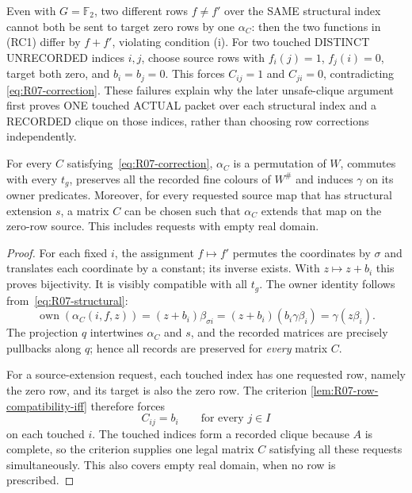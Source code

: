 \begin{remark}
\label{rem:R07-row-conflict-controls}
Even with $G=\mathbb F_2$,
two different rows $f\ne f'$
over the SAME structural index
cannot both be sent to target
zero rows by one $\alpha_C$:
then the two functions in (RC1)
differ by $f+f'$, violating
condition (i). For two touched
DISTINCT UNRECORDED indices
$i,j$, choose source rows
with $f_i(j)=1$, $f_j(i)=0$,
target both zero, and $b_i=b_j=0$.
This forces $C_{ij}=1$ and
$C_{ji}=0$, contradicting
\eqref{eq:R07-correction}.
These failures explain why
the later unsafe-clique
argument first proves ONE
touched ACTUAL packet over
each structural index and
a RECORDED clique on those
indices, rather than choosing
row corrections independently.
\end{remark}

\begin{lemma}
\label{lem:R07-zero-row}
For every $C$ satisfying~\eqref{eq:R07-correction},
$\alpha_C$ is a permutation of $W$, commutes with every $t_g$,
preserves all the recorded fine colours of $W^\#$ and induces
$\gamma$ on its owner predicates.  Moreover, for every requested
source map that has structural extension $s$, a matrix $C$ can be
chosen such that $\alpha_C$ extends that map on the zero-row
source.  This includes requests with empty real domain.
\end{lemma}
\begin{proof}
For each fixed $i$, the assignment $f\mapsto f'$ permutes the
coordinates by $\sigma$ and translates each coordinate by a
constant; its inverse exists.  With $z\mapsto z+b_i$ this
proves bijectivity.  It is visibly compatible with all $t_g$.
The owner identity follows from~\eqref{eq:R07-structural}:
\[
 \operatorname{own}(\alpha_C(i,f,z))
 =(z+b_i)\beta_{\sigma i}
 =(z+b_i)(b_i\gamma\beta_i)=\gamma(z\beta_i).
\]
The projection $q$ intertwines $\alpha_C$ and $s$, and the
recorded matrices are precisely pullbacks along $q$; hence all
records are preserved for \emph{every} matrix $C$.

For a source-extension request, each touched index has one requested
row, namely the zero row, and its target is also the zero row.
The criterion \cref{lem:R07-row-compatibility-iff} therefore forces
\begin{equation}\label{eq:R07-forced-row}
 C_{ij}=b_i\qquad\text{for every }j\in I
\end{equation}
on each touched $i$. The touched indices form a recorded clique
because $A$ is complete, so the criterion supplies one legal matrix
$C$ satisfying all these requests simultaneously. This also covers
empty real domain, when no row is prescribed.
\end{proof}

